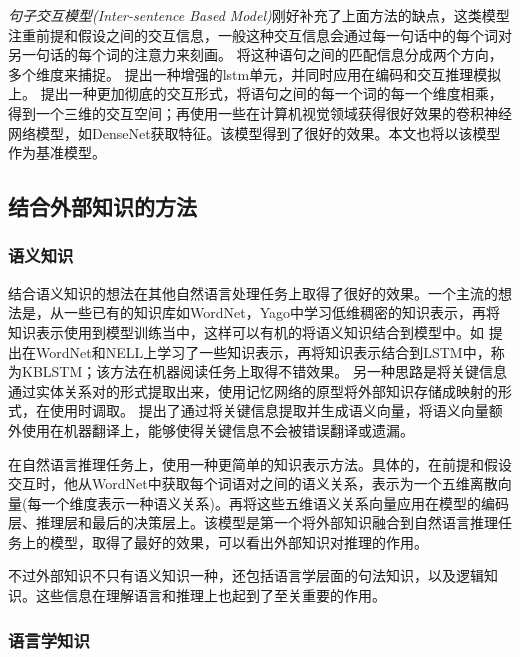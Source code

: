 \documentclass[UTF8,11pt,a4paper,nofonts]{ctexart}
\begin{document}
\textit{句子交互模型(Inter-sentence Based Model)}\cite{Wang2017Bilateral, Sha2016ReadingAT, chen2017enhanced, yichen2018nli}刚好补充了上面方法的缺点，这类模型注重前提和假设之间的交互信息，一般这种交互信息会通过每一句话中的每个词对另一句话的每个词的注意力来刻画。
\cite{Wang2017Bilateral}将这种语句之间的匹配信息分成两个方向，多个维度来捕捉。
\cite{chen2017enhanced}提出一种增强的lstm单元，并同时应用在编码和交互推理模拟上。
\cite{yichen2018nli}提出一种更加彻底的交互形式，将语句之间的每一个词的每一个维度相乘，得到一个三维的交互空间；再使用一些在计算机视觉领域获得很好效果的卷积神经网络模型，如DenseNet\cite{Huang2017DenselyCC}获取特征。该模型得到了很好的效果。本文也将以该模型作为基准模型。




\subsection{结合外部知识的方法}

\subsubsection{语义知识}

结合语义知识的想法在其他自然语言处理任务上取得了很好的效果。一个主流的想法是，从一些已有的知识库如WordNet，Yago中学习低维稠密的知识表示，再将知识表示使用到模型训练当中，这样可以有机的将语义知识结合到模型中。如
\cite{Yang2017LeveragingKB}提出在WordNet和NELL上学习了一些知识表示，再将知识表示结合到LSTM中，称为KBLSTM；该方法在机器阅读任务上取得不错效果。
另一种思路是将关键信息通过实体关系对的形式提取出来，使用记忆网络的原型将外部知识存储成映射的形式，在使用时调取。
\cite{Shi2016KnowledgeBasedSE}提出了通过将关键信息提取并生成语义向量，将语义向量额外使用在机器翻译上，能够使得关键信息不会被错误翻译或遗漏。

在自然语言推理任务上，\cite{Chen2017NaturalLI}使用一种更简单的知识表示方法。具体的，在前提和假设交互时，他从WordNet中获取每个词语对之间的语义关系，表示为一个五维离散向量(每一个维度表示一种语义关系)。再将这些五维语义关系向量应用在模型的编码层、推理层和最后的决策层上。该模型是第一个将外部知识融合到自然语言推理任务上的模型，取得了最好的效果，可以看出外部知识对推理的作用。

不过外部知识不只有语义知识一种，还包括语言学层面的句法知识，以及逻辑知识。这些信息在理解语言和推理上也起到了至关重要的作用。

\subsubsection{语言学知识}
\end{document}
